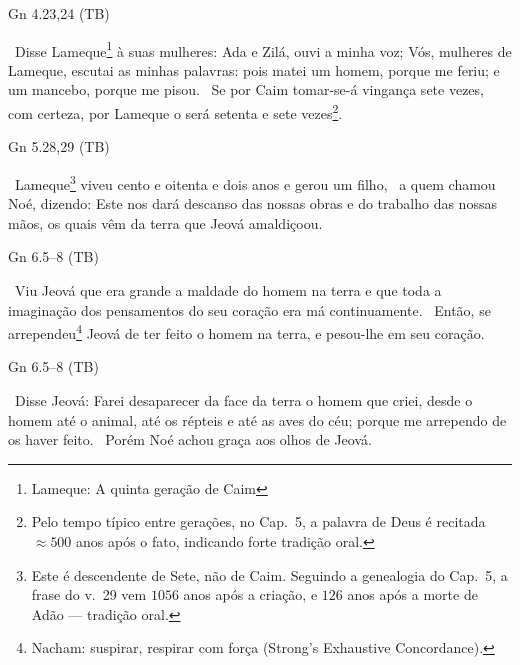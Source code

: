 \documentclass[12pt,aspectratio=169]{beamer}
\newcommand{\ver}[1]{%
    \raisebox{0.50ex}{%
        \scalebox{1.1}{%
            \pmb{\textbf{\textcolor{BSpbg}{#1}}}%
        }%
    }%
}
\newcommand{\QUOTE}[1]{%
    \par\noindent\hspace*{0.05\linewidth}%
    \begin{minipage}{0.9\linewidth}%
        \linespread{1.35}\large{#1}%
    \end{minipage}%
}
\newcommand{\RED}[1]{{\textcolor{TXred}{#1}}}
\newcommand{\YEL}[1]{{\textcolor{TXyel}{#1}}}
\newcommand{\GRE}[1]{{\textcolor{TXgre}{#1}}}
\newcommand{\BRI}[1]{{\textcolor{BSpbg}{#1}}}   %
\begin{document}
    \begin{frame}{Gn 4.23,24 (TB)}
        \QUOTE{%
            \ver{23}~Disse Lameque\footnote{Lameque: A quinta geração de Caim} à suas mulheres:
            Ada e Zilá, ouvi a minha voz; Vós, mulheres de Lameque, escutai as minhas palavras:
            pois \RED{matei um homem, porque me feriu}; e um \RED{mancebo, porque me pisou}.
            \ver{24}~Se por Caim tomar-se-á vingança sete vezes, com certeza, por Lameque o será
            setenta e sete vezes\footnote{Pelo tempo típico entre gerações, no Cap.~5, a palavra
            de Deus é recitada $\approx 500$ anos após o fato, indicando forte tradição oral.}.
        }
    \end{frame}

    \begin{frame}{Gn 5.28,29 (TB)}
        \QUOTE{%
            \ver{28}~Lameque\footnote{Este é descendente de Sete, não de Caim. Seguindo a
            genealogia do Cap.~5, a frase do v.~29 vem \BRI{$1056$ anos após a criação}, e
            \BRI{$126$ anos após a morte de Adão} --- tradição oral.} viveu cento e oitenta e
            dois anos e gerou um filho,
            \ver{29}~a quem chamou Noé, dizendo: Este nos dará \YEL{descanso das nossas obras e
            do trabalho} das nossas mãos, \YEL{os quais vêm da terra que Jeová amaldiçoou}.
        }
    \end{frame}

    \begin{frame}{Gn 6.5--8 (TB)}
        \QUOTE{%
            \ver{5}~Viu Jeová que era \RED{grande a maldade} do homem na terra e que \YEL{toda}
            a imaginação dos \RED{pensamentos} do seu coração era \RED{má} \YEL{continuamente}.
            \ver{6}~Então, se arrependeu\footnote{\YEL{Nacham}: \BRI{suspirar}, \BRI{respirar
            com força} (Strong's Exhaustive Concordance).} Jeová de ter feito o homem na terra,
            e pesou-lhe em seu coração.
        }
    \end{frame}

    \begin{frame}{Gn 6.5--8 (TB)}
        \QUOTE{%
            \ver{7}~Disse Jeová: Farei \RED{desaparecer da face da terra o homem que criei},
            desde o homem até o animal, até os répteis e até as aves do céu; porque me arrependo
            de os haver feito.
            \ver{8}~\GRE{Porém Noé achou graça aos olhos de Jeová}.
        }
    \end{frame}
\end{document}

